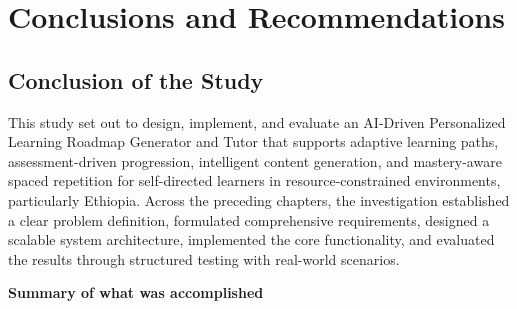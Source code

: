 \chapter{Conclusions and Recommendations}

\section{Conclusion of the Study}
\label{sec:conclusion}

This study set out to design, implement, and evaluate an AI-Driven Personalized Learning Roadmap Generator and Tutor that supports adaptive learning paths, assessment-driven progression, intelligent content generation, and mastery-aware spaced repetition for self-directed learners in resource-constrained environments, particularly Ethiopia. Across the preceding chapters, the investigation established a clear problem definition, formulated comprehensive requirements, designed a scalable system architecture, implemented the core functionality, and evaluated the results through structured testing with real-world scenarios.

\textbf{Summary of what was accomplished}

